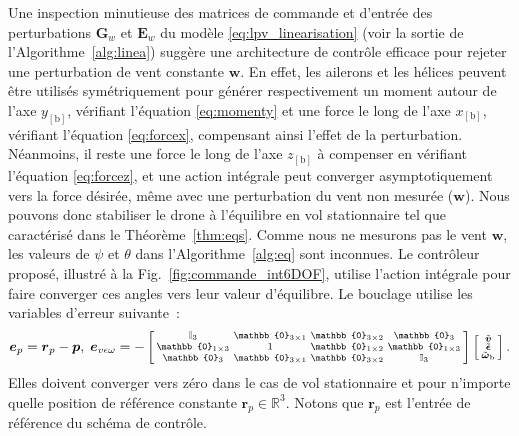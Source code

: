 Une inspection minutieuse des matrices de commande et d'entrée des perturbations $\boldsymbol{G}_{w}$ et $\boldsymbol{E}_{w}$ du modèle \eqref{eq:lpv_linearisation} (voir la sortie de l'Algorithme~\ref{alg:linea}) suggère une architecture de contrôle efficace pour rejeter une perturbation de vent constante $\boldsymbol{w}$. En effet, les ailerons et les hélices peuvent être utilisés symétriquement pour générer respectivement un moment autour de l'axe $y_{[\text{b}]}$, vérifiant l'équation \eqref{eq:momenty} et une force le long de l'axe $x_{[\text{b}]}$, vérifiant l'équation \eqref{eq:forcex}, compensant ainsi l'effet de la perturbation. Néanmoins, il reste une force le long de l'axe $z_{[\text{b}]}$ à compenser en vérifiant l'équation \eqref{eq:forcez}, et une action intégrale peut converger asymptotiquement vers la force désirée, même avec une perturbation du vent non mesurée ($\boldsymbol{w}$). Nous pouvons donc stabiliser le drone à l'équilibre en vol stationnaire tel que caractérisé dans le Théorème~\ref{thm:eqs}. Comme nous ne mesurons pas le vent $\boldsymbol{w}$, les valeurs de $\psi$ et $\theta$ dans l'Algorithme~\ref{alg:eq} sont inconnues. Le contrôleur proposé, illustré à la Fig.~\ref{fig:commande_int6DOF}, utilise l'action intégrale pour faire converger ces angles vers leur valeur d'équilibre. Le bouclage utilise les variables d'erreur suivante : 
\begin{align}
    \boldsymbol{e}_{p}= \boldsymbol{r}_{p} - \boldsymbol{p}, \; \boldsymbol{e}_{v \epsilon \omega} = -  
       \left[ \begin{smallmatrix} \mathbb{I}_{3}  & \mathbb{0}_{3\times 1} & \mathbb{0}_{3\times 2} & \mathbb{0}_{3}\\
       \mathbb{0}_{1\times 3}  & 1 & \mathbb{0}_{1\times 2} & \mathbb{0}_{1 \times 3} \\
           \mathbb{0}_{3}  & \mathbb{0}_{3\times 1} & \mathbb{0}_{3\times 2} &   \mathbb{I}_{3}
           \end{smallmatrix} \right]
    \smallmat{
           \tilde{\boldsymbol{v}} \\
           \tilde{\boldsymbol{\epsilon}} \\
           \tilde{\boldsymbol{\omega}}_{\text{b}} 
    }.
  \label{eq:error_var}
\end{align} 
Elles doivent converger vers zéro dans le cas de vol stationnaire et pour n'importe quelle position de référence constante $\boldsymbol{r}_{p} \in \mathbb{R}^{3}$. Notons que $\boldsymbol{r}_{p}$ est l'entrée de référence du schéma de contrôle.

